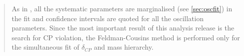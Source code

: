 \begin{frontmatter}
\begin{abstract}
As in \cite{OurRun56AntiNueBarAppearanceAnalysis3Flavour},
all the systematic parameters are marginalised (see \cref{sec:oscfit})
in the fit and 
confidence intervals are quoted for all the oscillation parameters.
Since the most important result of this analysis release is the search for CP violation,
the Feldman-Cousins method \cite{FeldmanCousins} is performed only for the simultaneous fit of $\delta_{CP}$ and mass hierarchy.


\end{abstract}

\end{frontmatter}
